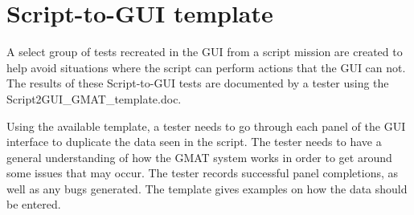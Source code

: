 \chapter{Script-to-GUI template}

A select group of tests recreated in the GUI from a script mission
are created to help avoid situations where the script can perform
actions that the GUI can not. The results of these Script-to-GUI
tests are documented by a tester using the
Script2GUI\_GMAT\_template.doc.

Using the available template, a tester needs to go through each
panel of the GUI interface to duplicate the data seen in the script.
The tester needs to have a general understanding of how the GMAT
system works in order to get around some issues that may occur. The
tester records successful panel completions, as well as any bugs
generated. The template gives examples on how the data should be
entered.
